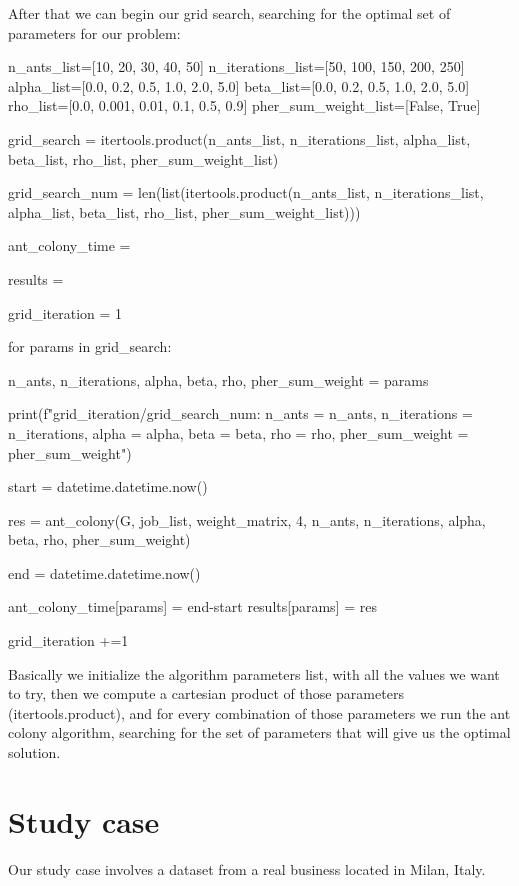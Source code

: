 \documentclass[titlepage]{article}
\begin{document}
After that we can begin our grid search, searching for the optimal set of parameters for our problem:

\begin{python}
n_ants_list=[10, 20, 30, 40, 50]
n_iterations_list=[50, 100, 150, 200, 250]
alpha_list=[0.0, 0.2, 0.5, 1.0, 2.0, 5.0]
beta_list=[0.0, 0.2, 0.5, 1.0, 2.0, 5.0]
rho_list=[0.0, 0.001, 0.01, 0.1, 0.5, 0.9]
pher_sum_weight_list=[False, True]

grid_search = itertools.product(n_ants_list, n_iterations_list, alpha_list, beta_list, rho_list, pher_sum_weight_list)

grid_search_num = len(list(itertools.product(n_ants_list, n_iterations_list, alpha_list, beta_list, rho_list, pher_sum_weight_list)))

ant_colony_time = {}

results = {}

grid_iteration = 1

for params in grid_search:

    n_ants, n_iterations, alpha, beta, rho, pher_sum_weight = params

    print(f"{grid_iteration}/{grid_search_num}: n_ants = {n_ants}, n_iterations = {n_iterations}, alpha = {alpha}, beta = {beta}, rho = {rho}, pher_sum_weight = {pher_sum_weight}")
    
    start = datetime.datetime.now()
    
    res = ant_colony(G, job_list, weight_matrix, 4, n_ants, n_iterations, alpha, beta, rho, pher_sum_weight)
    
    end = datetime.datetime.now()
    
    ant_colony_time[params] = end-start
    results[params] = res

    grid_iteration +=1
\end{python}

Basically we initialize the algorithm parameters list, with all the values we want to try, then we compute a cartesian product of those parameters (itertools.product), and for every combination of those parameters we run the ant colony algorithm, searching for the set of parameters that will give us the optimal solution.

\section{Study case}
Our study case involves a dataset from a real business located in Milan, Italy.
\end{document}
